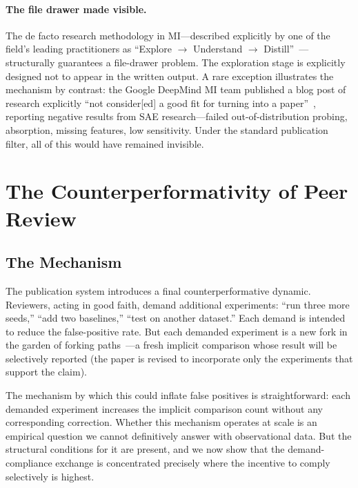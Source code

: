 \documentclass{article}
\begin{document}
\paragraph{The file drawer made visible.} The de facto research methodology in MI---described explicitly by one of the field's leading practitioners as ``Explore $\to$ Understand $\to$ Distill''~\citep{nanda_research_process_2023}---structurally guarantees a file-drawer problem. The exploration stage is explicitly designed not to appear in the written output. A rare exception illustrates the mechanism by contrast: the Google DeepMind MI team published a blog post of research explicitly ``not consider[ed] a good fit for turning into a paper''~\citep{smith_gdm_negative_2025}, reporting negative results from SAE research---failed out-of-distribution probing, absorption, missing features, low sensitivity. Under the standard publication filter, all of this would have remained invisible.

\section{The Counterperformativity of Peer Review}
\label{sec:counterperformativity}

\subsection{The Mechanism}

The publication system introduces a final counterperformative dynamic. Reviewers, acting in good faith, demand additional experiments: ``run three more seeds,'' ``add two baselines,'' ``test on another dataset.'' Each demand is intended to reduce the false-positive rate. But each demanded experiment is a new fork in the garden of forking paths~\citep{gelman_garden_2013}---a fresh implicit comparison whose result will be selectively reported (the paper is revised to incorporate only the experiments that support the claim).

The mechanism by which this could inflate false positives is straightforward: each demanded experiment increases the implicit comparison count without any corresponding correction. Whether this mechanism operates at scale is an empirical question we cannot definitively answer with observational data. But the structural conditions for it are present, and we now show that the demand-compliance exchange is concentrated precisely where the incentive to comply selectively is highest.
\end{document}
